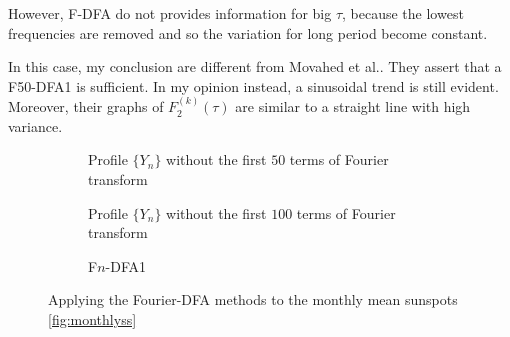 However, F-DFA do not provides information for big $\tau$, because the lowest frequencies are removed and so the variation for long period become constant. 

In this case, my conclusion are different from Movahed et al.. They assert that a F50-DFA1 is sufficient. In my opinion instead, a sinusoidal trend is still evident. Moreover, their graphs of $F_2^{( k )}(\tau)$ are similar to a straight line with high variance.

\begin{figure}[!h]
	\centering
	\begin{subfigure}{0.48\textwidth}
		\centering
		
		\caption{Profile $\{Y_n\}$ without the first $50$ terms of Fourier transform}\label{fig:f50}
	\end{subfigure}
	\hfill
	\begin{subfigure}{0.48\textwidth}
		\centering
		
		\caption{Profile $\{Y_n\}$ without the first $100$ terms of Fourier transform}\label{fig:f100}
	\end{subfigure}
	\vfill
	\begin{subfigure}{\textwidth}
		\centering
		
		\caption{F$n$-DFA1\\}
	\end{subfigure}
	\caption{Applying the Fourier-DFA methods to the monthly mean sunspots \ref{fig:monthlyss}}\label{fig:fdfa}
\end{figure}